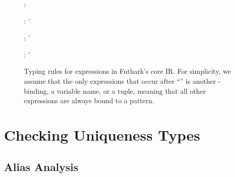 \begin{figure}[bt]

{\Gamma \vd {} : \rho}


{\Gamma \vd {} : \rho'}

{\Gamma \vd {} : \rho'}

{\Gamma \vd {} : \rho'}

\caption{Typing rules for expressions in Futhark's core IR.  For
  simplicity, we assume that the only expressions that occur after
  ``'' is another -binding, a variable name, or a
  tuple, meaning that all other expressions are always bound to a
  pattern.}
\label{fig:srcTypeRulesExps}
\end{figure}


\section{Checking Uniqueness Types}
\label{sec:uniqueness-formalism}

\subsection{Alias Analysis}

\newcommand{\expAliases}[3]{#1 \vdash #2 \Rightarrow #3}
\newcommand{\aliases}[1]{\textrm{aliases}(#1)}
\newcommand{\seqOccurences}[3]{#1 \gg #2 : #3}

